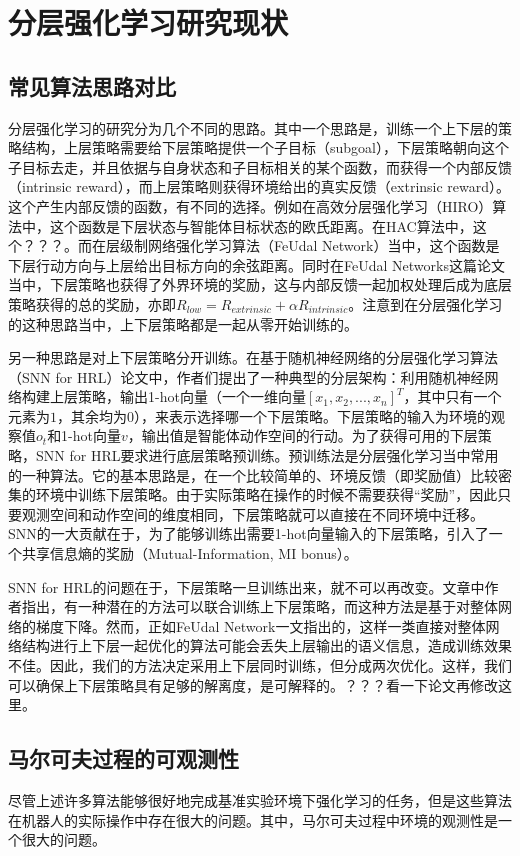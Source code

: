 \section{分层强化学习研究现状}
\subsection{常见算法思路对比}
分层强化学习的研究分为几个不同的思路。其中一个思路是，训练一个上下层的策略结构，上层策略需要给下层策略提供一个子目标（subgoal），下层策略朝向这个子目标去走，并且依据与自身状态和子目标相关的某个函数，而获得一个内部反馈（intrinsic reward），而上层策略则获得环境给出的真实反馈（extrinsic reward）。这个产生内部反馈的函数，有不同的选择。例如在高效分层强化学习（HIRO\cite{HIRO}）算法中，这个函数是下层状态与智能体目标状态的欧氏距离。在HAC\cite{HAC}算法中，这个？？？。而在层级制网络强化学习算法（FeUdal Network\cite{feudal}）当中，这个函数是下层行动方向与上层给出目标方向的余弦距离。同时在FeUdal Networks这篇论文当中，下层策略也获得了外界环境的奖励，这与内部反馈一起加权处理后成为底层策略获得的总的奖励，亦即$R_{low} = R_{extrinsic} + \alpha R_{intrinsic}$。注意到在分层强化学习的这种思路当中，上下层策略都是一起从零开始训练的。

另一种思路是对上下层策略分开训练。在基于随机神经网络的分层强化学习算法（SNN for HRL\cite{SNN4hrl}）论文中，作者们提出了一种典型的分层架构：利用随机神经网络构建上层策略，输出1-hot向量（一个一维向量$[x_1, x_2, ..., x_n]^T$，其中只有一个元素为$1$，其余均为$0$），来表示选择哪一个下层策略。下层策略的输入为环境的观察值$o_t$和1-hot向量$v$，输出值是智能体动作空间的行动。为了获得可用的下层策略，SNN for HRL要求进行底层策略预训练。预训练法是分层强化学习当中常用的一种算法。它的基本思路是，在一个比较简单的、环境反馈（即奖励值）比较密集的环境中训练下层策略。由于实际策略在操作的时候不需要获得``奖励''，因此只要观测空间和动作空间的维度相同，下层策略就可以直接在不同环境中迁移。SNN的一大贡献在于，为了能够训练出需要1-hot向量输入的下层策略，引入了一个共享信息熵的奖励（Mutual-Information, MI bonus）。

SNN for HRL的问题在于，下层策略一旦训练出来，就不可以再改变。文章中作者指出，有一种潜在的方法可以联合训练上下层策略，而这种方法是基于对整体网络的梯度下降\cite{categorical_gradient}。然而，正如FeUdal Network\cite{feudal}一文指出的，这样一类直接对整体网络结构进行上下层一起优化的算法可能会丢失上层输出的语义信息，造成训练效果不佳。因此，我们的方法决定采用上下层同时训练，但分成两次优化。这样，我们可以确保上下层策略具有足够的解离度，是可解释的。？？？看一下论文再修改这里。

\subsection{马尔可夫过程的可观测性}
尽管上述许多算法能够很好地完成基准实验环境下强化学习的任务，但是这些算法在机器人的实际操作中存在很大的问题。其中，马尔可夫过程中环境的观测性是一个很大的问题。

